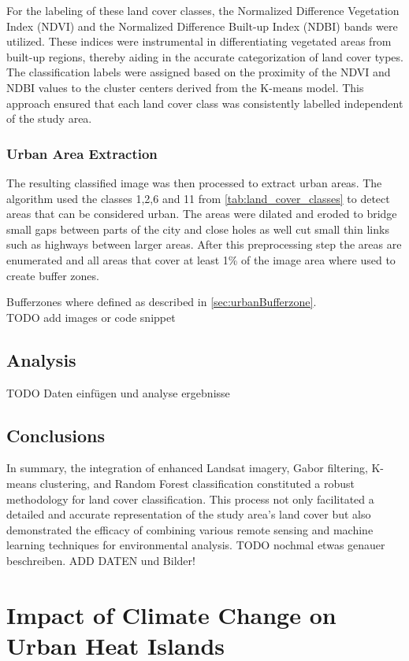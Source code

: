 \documentclass[12pt,a4paper, english]{article}
\begin{document}
      For the labeling of these land cover classes, the Normalized Difference Vegetation Index (NDVI) and the Normalized Difference Built-up Index (NDBI) bands were utilized.
      These indices were instrumental in differentiating vegetated areas from built-up regions, thereby aiding in the accurate categorization of land cover types.
      The classification labels were assigned based on the proximity of the NDVI and NDBI values to the cluster centers derived from the K-means model.
      This approach ensured that each land cover class was consistently labelled independent of the study area.\\
    \subsubsection{Urban Area Extraction}
      The resulting classified image was then processed to extract urban areas.
      The algorithm used the classes 1,2,6 and 11 from \cref{tab:land_cover_classes} to detect areas that can be considered urban.
      The areas were \gls{dilated} and \gls{eroded} to bridge small gaps between parts of the city and close holes as well cut small thin links such as highways between larger areas.
      After this preprocessing step the areas are enumerated and all areas that cover at least 1\% of the image area where used to create buffer zones. 
  
      Bufferzones where defined as described in \cref{sec:urbanBufferzone}.\\
      TODO add images or code snippet
 \subsection{Analysis}\label{sec:landcoverAnalysis}
    TODO Daten einfügen und analyse ergebnisse
 \subsection{Conclusions}
    In summary, the integration of enhanced Landsat imagery, Gabor filtering, K-means clustering, and Random Forest classification constituted a robust methodology for land cover classification.
    This process not only facilitated a detailed and accurate representation of the study area's land cover but also demonstrated the efficacy of combining various remote sensing and machine learning techniques for environmental analysis.
    TODO nochmal etwas genauer beschreiben. ADD DATEN und Bilder! 
  \newpage
  \section{Impact of Climate Change on Urban Heat Islands}\label{sec:UHITempImp}
\end{document}
